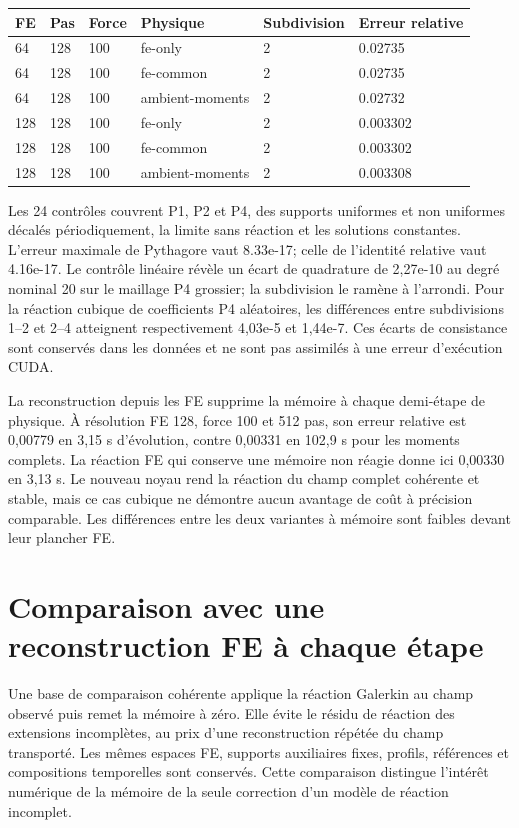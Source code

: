 \documentclass[10pt,a4paper]{article}
\begin{document}
\begin{center}\small\begin{tabular}{llllll}\toprule
FE & Pas & Force & Physique & Subdivision & Erreur relative\\\midrule
64 & 128 & 100 & fe-only & 2 & 0.02735\\
64 & 128 & 100 & fe-common & 2 & 0.02735\\
64 & 128 & 100 & ambient-moments & 2 & 0.02732\\
128 & 128 & 100 & fe-only & 2 & 0.003302\\
128 & 128 & 100 & fe-common & 2 & 0.003302\\
128 & 128 & 100 & ambient-moments & 2 & 0.003308\\
\bottomrule\end{tabular}\end{center}
Les 24 contrôles couvrent P1, P2 et P4, des supports uniformes et non uniformes décalés périodiquement, la limite sans réaction et les solutions constantes. L'erreur maximale de Pythagore vaut 8.33e-17; celle de l'identité relative vaut 4.16e-17. Le contrôle linéaire révèle un écart de quadrature de 2,27e-10 au degré nominal 20 sur le maillage P4 grossier; la subdivision le ramène à l'arrondi. Pour la réaction cubique de coefficients P4 aléatoires, les différences entre subdivisions 1–2 et 2–4 atteignent respectivement 4,03e-5 et 1,44e-7. Ces écarts de consistance sont conservés dans les données et ne sont pas assimilés à une erreur d'exécution CUDA.

La reconstruction depuis les FE supprime la mémoire à chaque demi-étape de physique. À résolution FE 128, force 100 et 512 pas, son erreur relative est 0,00779 en 3,15 s d'évolution, contre 0,00331 en 102,9 s pour les moments complets. La réaction FE qui conserve une mémoire non réagie donne ici 0,00330 en 3,13 s. Le nouveau noyau rend la réaction du champ complet cohérente et stable, mais ce cas cubique ne démontre aucun avantage de coût à précision comparable. Les différences entre les deux variantes à mémoire sont faibles devant leur plancher FE.

\section{Comparaison avec une reconstruction FE à chaque étape}
Une base de comparaison cohérente applique la réaction Galerkin au champ observé puis remet la mémoire à zéro. Elle évite le résidu de réaction des extensions incomplètes, au prix d'une reconstruction répétée du champ transporté. Les mêmes espaces FE, supports auxiliaires fixes, profils, références et compositions temporelles sont conservés. Cette comparaison distingue l'intérêt numérique de la mémoire de la seule correction d'un modèle de réaction incomplet.
\end{document}
